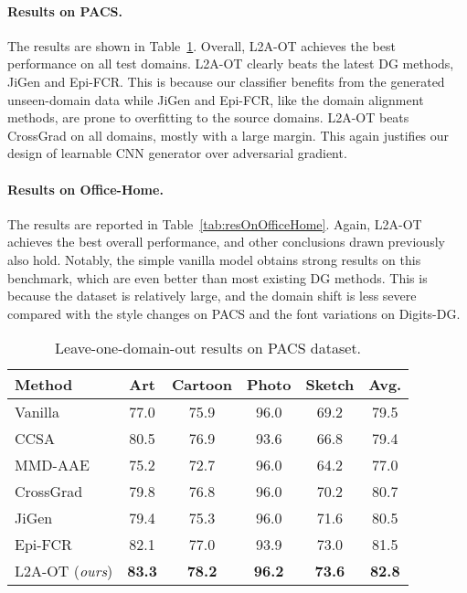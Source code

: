 \documentclass[runningheads]{llncs}
\begin{document}
\paragraph{Results on PACS.}
The results are shown in Table~\ref{tab:resOnPACS}. Overall, L2A-OT achieves the best performance on all test domains. L2A-OT clearly beats the latest DG methods, JiGen and Epi-FCR. This is because our classifier benefits from the generated unseen-domain data while JiGen and Epi-FCR, like the domain alignment methods, are prone to overfitting to the source domains. L2A-OT beats CrossGrad on all domains, mostly with a large margin. This again justifies our design of learnable CNN generator over adversarial gradient.

\paragraph{Results on Office-Home.}
The results are reported in Table~\ref{tab:resOnOfficeHome}. Again, L2A-OT achieves the best overall performance, and other conclusions drawn previously also hold. Notably, the simple vanilla model obtains strong results on this benchmark, which are even better than most existing DG methods. This is because the dataset is relatively large, and the domain shift is less severe compared with the style changes on PACS and the font variations on Digits-DG.

\begin{table}[t]
\tabstyle{7pt}
\begin{tabular}{l | c c c c | c}
\hline
Method & Art & Cartoon & Photo & Sketch & Avg. \\ \hline
Vanilla & 77.0 & 75.9 & 96.0 & 69.2 & 79.5 \\
CCSA~\cite{motiian2017unified} & 80.5 & 76.9 & 93.6 & 66.8 & 79.4 \\
MMD-AAE~\cite{li2018mmdaae} & 75.2 & 72.7 & 96.0 & 64.2 & 77.0 \\
CrossGrad~\cite{shankar2018generalizing} & 79.8 & 76.8 & 96.0 & 70.2 & 80.7 \\
JiGen~\cite{cvpr19JiGen} & 79.4 & 75.3 & 96.0 & 71.6 & 80.5 \\
Epi-FCR~\cite{li2019episodic} & 82.1 & 77.0 & 93.9 & 73.0 & 81.5 \\
L2A-OT (\emph{ours}) & \textbf{83.3} & \textbf{78.2} & \textbf{96.2} & \textbf{73.6} & \textbf{82.8} \\
\hline
\end{tabular}
\caption{Leave-one-domain-out results on PACS dataset.}
\label{tab:resOnPACS}
\end{table}
\end{document}
